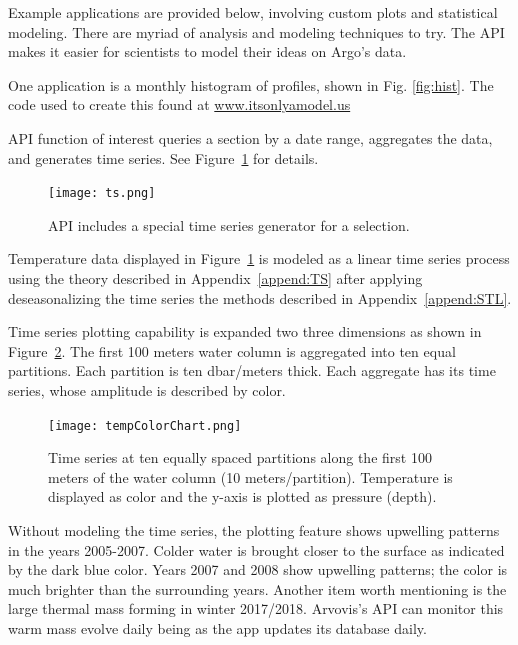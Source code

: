 Example applications are provided below, involving custom plots and statistical modeling. There are myriad of analysis and modeling techniques to try. The API makes it easier for scientists to model their ideas on Argo's data.

One application is a monthly histogram of profiles, shown in Fig. \ref{fig:hist}. The code used to create this found at \url{www.itsonlyamodel.us}

API function of interest queries a section by a date range, aggregates the data, and generates time series. See Figure~\ref{fig:ts} for details.

\begin{figure}[H]
\centering
\begin{minipage}{6in}
\texttt{[image: ts.png]}
\caption{\label{fig:ts}API includes a special time series generator for a selection.}
\end{minipage}
\end{figure}

Temperature data displayed in Figure~\ref{fig:ts} is modeled as a linear time series process using the theory described in Appendix~\ref{append:TS} after applying deseasonalizing the time series the methods described in Appendix~\ref{append:STL}.

Time series plotting capability is expanded two three dimensions as shown in Figure~\ref{fig:vts}. The first 100 meters water column is aggregated into ten equal partitions. Each partition is ten dbar/meters thick. Each aggregate has its time series, whose amplitude is described by color. 

\begin{figure}[H]
\centering
\begin{minipage}{4in}
\texttt{[image: tempColorChart.png]}
\caption{\label{fig:vts}Time series at ten equally spaced partitions along the first 100 meters of the water column (10 meters/partition). Temperature is displayed as color and the y-axis is plotted as pressure (depth).}
\end{minipage}
\end{figure}

Without modeling the time series, the plotting feature shows upwelling patterns in the years 2005-2007. Colder water is brought closer to the surface as indicated by the dark blue color. Years 2007 and 2008 show upwelling patterns; the color is much brighter than the surrounding years. Another item worth mentioning is the large thermal mass forming in winter 2017/2018. Arvovis's API can monitor this warm mass evolve daily being as the app updates its database daily.

